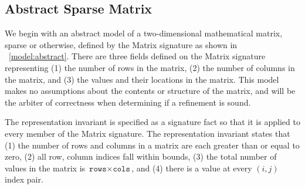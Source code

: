 
\subsection{Abstract Sparse Matrix}

We begin with an abstract model of a two-dimensional mathematical matrix, sparse or otherwise, defined by the Matrix signature as shown in \figurename~\ref{model:abstract}.  There are three fields defined on the Matrix signature representing (1) the number of rows in the matrix, (2) the number of columns in the matrix, and (3) the values and their locations in the matrix.  This model makes no assumptions about the contents or structure of the matrix, and will be the arbiter of correctness when determining if a refinement is sound.

\begin{figure}

\end{figure}

% 

The representation invariant is specified as a signature fact so that it is applied to every member of the Matrix signature.  The representation invariant states that (1) the number of rows and columns in a matrix are each greater than or equal to zero, (2) all row, column indices fall within bounds, (3) the total number of values in the matrix is $\texttt{rows}\times\texttt{cols}$, and (4) there is a value at every $\left(i, j\right)$ index pair.

